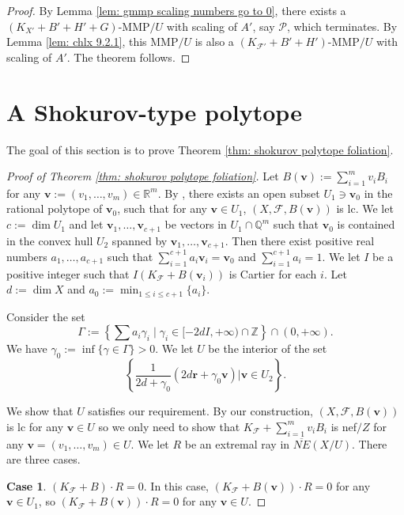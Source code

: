 \documentclass[11pt]{amsart}
\numberwithin{equation}{section}
\newcommand{\Ff}{\mathcal{F}}
\newcommand{\Ii}{\Gamma}
\theoremstyle{definition}
\theoremstyle{definition}
\theoremstyle{definition}
\begin{document}
\begin{proof}
By Lemma \ref{lem: gmmp scaling numbers go to 0}, there exists a $(K_{X'}+B'+H'+G)$-MMP$/U$ with scaling of $A'$, say $\mathcal{P}$, which terminates. By Lemma \ref{lem: chlx 9.2.1}, this MMP$/U$ is also a $(K_{\Ff'}+B'+H')$-MMP$/U$ with scaling of $A'$. The theorem follows.
\end{proof}



\section{A Shokurov-type polytope}\label{sec: sho polytope}

The goal of this section is to prove Theorem \ref{thm: shokurov polytope foliation}. 

\begin{proof}[Proof of Theorem \ref{thm: shokurov polytope foliation}] Let $B(\bm{v}):=\sum_{i=1}^m v_iB_i$ for any $\bm{v}:=(v_1,\dots,v_m)\in\mathbb R^m$. By \cite[Theorem 1.5]{DLM23}, there exists an open subset $U_1\ni\bm{v}_0$ in the rational polytope of $\bm{v}_0$, such that for any  $\bm{v}\in U_1$, $(X,\Ff,B(\bm{v}))$ is lc. We let $c:=\dim U_1$ and let $\bm{v}_1,\dots,\bm{v}_{c+1}$ be vectors in $U_1\cap\mathbb Q^m$ such that $\bm{v}_0$ is contained in the convex hull $U_2$ spanned by
    $\bm{v}_1,\dots,\bm{v}_{c+1}$. Then there exist positive real numbers $a_1,\dots,a_{c+1}$ such that $\sum_{i=1}^{c+1}a_i\bm{v}_i=\bm{v}_0$ and $\sum_{i=1}^{c+1}a_i=1$. We let $I$ be a positive integer such that $I(K_{\Ff}+B(\bm{v}_i))$ is Cartier for each $i$. Let $d:=\dim X$ and $a_0:=\min_{1\leq i\leq c+1}\{a_i\}$. 

    Consider the set
    $$\Ii:=\left\{\sum a_i\gamma_i\mid\gamma_i\in [-2dI,+\infty)\cap\mathbb Z\right\}\cap (0,+\infty).$$
    We have $\gamma_0:=\inf\{\gamma\in\Ii\}>0$. We let $U$ be the interior of the set
    $$\left\{\frac{1}{2d+\gamma_0}(2d\bm{r}+\gamma_0\bm{v})\Bigg| \bm{v}\in U_2\right\}.$$

    We show that $U$ satisfies our requirement. By our construction, $(X,\Ff,B(\bm{v}))$ is lc for any $\bm{v}\in U$ so we only need to show that $K_{\Ff}+\sum_{i=1}^mv_iB_i$ is nef$/Z$ for any $\bm{v}=(v_1,\dots,v_m)\in U$. We let $R$ be an extremal ray in $\overline{NE}(X/U)$. There are three cases.

    \medskip

    \noindent\textbf{Case 1}. $(K_{\Ff}+B)\cdot R=0$. In this case, $(K_{\Ff}+B(\bm{v}))\cdot R=0$ for any $\bm{v}\in U_1$, so $(K_{\Ff}+B(\bm{v}))\cdot R=0$ for any $\bm{v}\in U$.


\end{proof}
\end{document}
